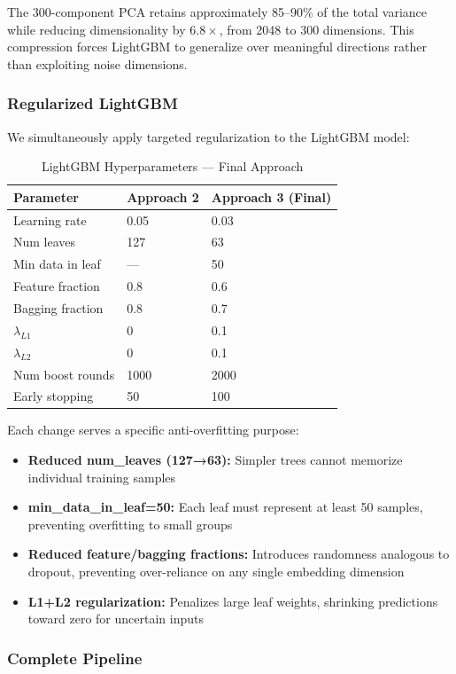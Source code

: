 \documentclass[conference]{IEEEtran}
\begin{document}
The 300-component PCA retains approximately 85--90\% of the total variance while reducing dimensionality by $6.8\times$, from 2048 to 300 dimensions. This compression forces LightGBM to generalize over meaningful directions rather than exploiting noise dimensions.

\subsubsection{Regularized LightGBM}
We simultaneously apply targeted regularization to the LightGBM model:

\begin{table}[H]
\centering
\caption{LightGBM Hyperparameters — Final Approach}
\begin{tabular}{lll}
\toprule
Parameter & Approach 2 & Approach 3 (Final) \\
\midrule
Learning rate & 0.05 & 0.03 \\
Num leaves & 127 & 63 \\
Min data in leaf & — & 50 \\
Feature fraction & 0.8 & 0.6 \\
Bagging fraction & 0.8 & 0.7 \\
$\lambda_{L1}$ & 0 & 0.1 \\
$\lambda_{L2}$ & 0 & 0.1 \\
Num boost rounds & 1000 & 2000 \\
Early stopping & 50 & 100 \\
\bottomrule
\end{tabular}
\end{table}

Each change serves a specific anti-overfitting purpose:
\begin{itemize}
    \item \textbf{Reduced num\_leaves (127→63):} Simpler trees cannot memorize individual training samples
    \item \textbf{min\_data\_in\_leaf=50:} Each leaf must represent at least 50 samples, preventing overfitting to small groups
    \item \textbf{Reduced feature/bagging fractions:} Introduces randomness analogous to dropout, preventing over-reliance on any single embedding dimension
    \item \textbf{L1+L2 regularization:} Penalizes large leaf weights, shrinking predictions toward zero for uncertain inputs
\end{itemize}

\subsubsection{Complete Pipeline}
\end{document}
